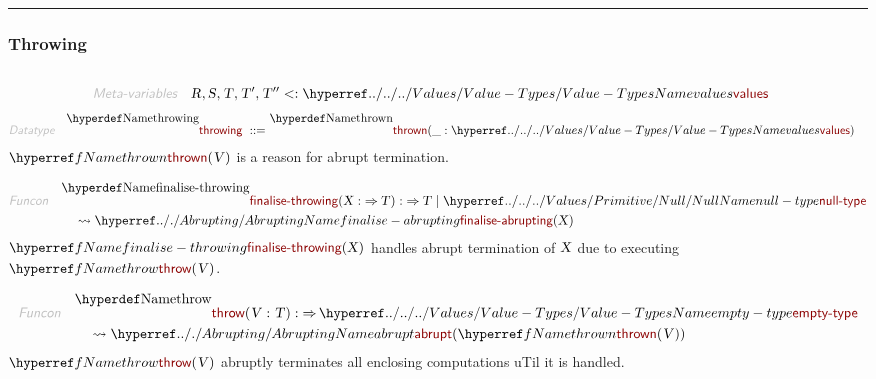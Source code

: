 

\begin{center}
\rule{3in}{0.4pt}
\end{center}

\subsubsection{Throwing}\hypertarget{throwing}{}\label{throwing}

\begin{align*}
  [ \
  \KEY{Datatype} \quad & \NAMEREF{throwing} \\
  \KEY{Funcon} \quad & \NAMEREF{thrown} \\
  \KEY{Funcon} \quad & \NAMEREF{finalise-throwing} \\
  \KEY{Funcon} \quad & \NAMEREF{throw} \\
  \KEY{Funcon} \quad & \NAMEREF{handle-thrown} \\
  \KEY{Funcon} \quad & \NAMEREF{handle-recursively} \\
  \KEY{Funcon} \quad & \NAMEREF{catch-else-throw}
  \ ]
\end{align*}
\begin{align*}
  \KEY{Meta-variables} \quad
  & \VAR{R}, \VAR{S}, \VAR{T}, \VAR{T}', \VAR{T}'' <: \NAMEHYPER{../../../Values}{Value-Types}{values}
\end{align*}
\begin{align*}
  \KEY{Datatype} \quad 
  \NAMEDECL{throwing} 
  \ ::= \ & \NAMEDECL{thrown}(
                               \_ : \NAMEHYPER{../../../Values}{Value-Types}{values})
\end{align*}
$\SHADE{\NAMEREF{thrown}
           (  \VAR{V} )}$ is a reason for abrupt termination.

\begin{align*}
  \KEY{Funcon} \quad
  & \NAMEDECL{finalise-throwing}(
                       \VAR{X} :  \TO \VAR{T}) 
    :  \TO \VAR{T}  \mid \NAMEHYPER{../../../Values/Primitive}{Null}{null-type} \\&\quad
    \leadsto \NAMEHYPER{../.}{Abrupting}{finalise-abrupting}
               (  \VAR{X} )
\end{align*}
$\SHADE{\NAMEREF{finalise-throwing}
           (  \VAR{X} )}$ handles abrupt termination of $\SHADE{\VAR{X}}$ due to
  executing $\SHADE{\NAMEREF{throw}
           (  \VAR{V} )}$.

\begin{align*}
  \KEY{Funcon} \quad
  & \NAMEDECL{throw}(
                       \VAR{V} : \VAR{T}) 
    :  \TO \NAMEHYPER{../../../Values}{Value-Types}{empty-type} \\&\quad
    \leadsto \NAMEHYPER{../.}{Abrupting}{abrupt}
               (  \NAMEREF{thrown}
                       (  \VAR{V} ) )
\end{align*}
$\SHADE{\NAMEREF{throw}
           (  \VAR{V} )}$ abruptly terminates all enclosing computations uTil it is handled.

